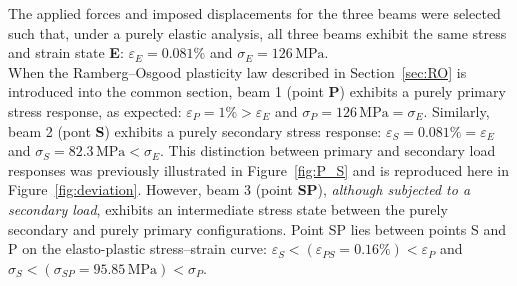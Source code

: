 \documentclass[10pt,a4paper]{article}
\begin{document}
The applied forces and imposed displacements for the three beams were selected such that, under a purely elastic analysis, all three beams exhibit the same stress and strain state \textbf{E}: $ \varepsilon_E=0.081\%$ and $\sigma_E = 126\,\mathrm{MPa}$. \\

When the Ramberg--Osgood plasticity law described in Section~\ref{sec:RO} is introduced into the common section, beam 1 (point \textbf{P}) exhibits a purely primary stress response, as expected: $ \varepsilon_P=1\% >  \varepsilon_E $ and $\sigma_P = 126\,\mathrm{MPa}=\sigma_E$. Similarly, beam 2 (pont \textbf{S}) exhibits a purely secondary stress response: $ \varepsilon_S=0.081\% =  \varepsilon_E $ and $\sigma_S = 82.3\,\mathrm{MPa} < \sigma_E$. This distinction between primary and secondary load responses was previously illustrated in Figure~\ref{fig:P_S} and is reproduced here in Figure~\ref{fig:deviation}. However, beam 3 (point \textbf{SP}), \emph{although subjected to a secondary load}, exhibits an intermediate stress state between the purely secondary and purely primary configurations. Point SP lies between points S and P on the elasto-plastic stress--strain curve: $ \varepsilon_S<  \left( \varepsilon_{PS}=0.16\% \right) < \varepsilon_P $ and  $\sigma_S < \left( \sigma_{SP}= 95.85\,\mathrm{MPa} \right) < \sigma_P $. \\
\end{document}
